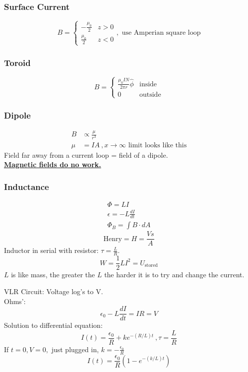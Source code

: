 \documentclass[10pt,a4paper]{article}
\begin{document}
\subsubsection{Surface Current}
\[
 B =
  \begin{cases}
   -\frac{\mu_0}{2}& z > 0\\
   \frac{\mu_0}{2}& z< 0
  \end{cases}, \textrm{ use Amperian square loop}
\]

\subsubsection{Toroid}
\[
 B =
  \begin{cases}
  \frac{\mu_0 IN}{2 \pi r} \hat{\phi} & \textrm{inside} \\
   0 & \textrm{outside}
  \end{cases}
\]

\subsubsection{Dipole}
\begin{align}
 B &\propto \frac{\mu}{r^3}\\
 \mu &= I A ~, x \rightarrow \infty \textrm{ limit looks like this}
\end{align}
Field far away from a current loop = field of a dipole.\\

\underline{\textbf{Magnetic fields do no work.}}

\subsubsection{Inductance}
\begin{align}
 \Phi = LI\\
 \epsilon = -L \frac{dI}{dt}\\
 \Phi_B = \int B \cdot dA
\end{align}
\begin{equation}
 \textrm{Henry} = H = \frac{Vs}{A}
\end{equation}
Inductor in serial with resistor: $\tau = \frac{L}{R}$.
\begin{equation}
 W = \frac{1}{2}LI^2 = U_{\textrm{stored}}
\end{equation}
$L$ is like mass, the greater the $L$ the harder it is to try and change the current.

VLR Circuit: Voltage log's to V.\\
Ohms':
\begin{equation}
 \epsilon_0 - L\frac{dI}{dt} = IR = V
\end{equation}
Solution to differential equation:
\begin{equation}
 I(t) = \frac{\epsilon_0}{R} + ke^{-(R/L)t}~,\tau = \frac{L}{R}
\end{equation}
If $t=0, V=0,$ just plugged in, $k = -\frac{\epsilon_0}{R}$
\begin{equation}
 I(t) = \frac{\epsilon_0}{R} \left( 1-e^{-(k/L)t} \right) 
\end{equation}
\end{document}

